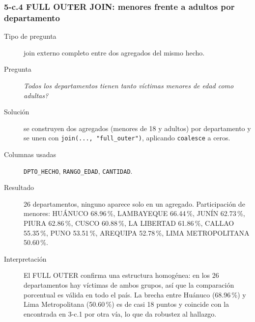 \subsubsection*{5-c.4 \textbar{} FULL OUTER JOIN: menores frente a adultos por departamento}
\begin{description}
\item[Tipo de pregunta] join externo completo entre dos agregados del mismo hecho.
\item[Pregunta] \emph{Todos los departamentos tienen tanto v\'ictimas menores de edad como
      adultas?}
\item[Soluci\'on] se construyen dos agregados (menores de 18 y adultos) por departamento y se
      unen con \texttt{join(..., "full\_outer")}, aplicando \texttt{coalesce} a ceros.
\item[Columnas usadas] \texttt{DPTO\_HECHO}, \texttt{RANGO\_EDAD}, \texttt{CANTIDAD}.
\item[Resultado] 26 departamentos, ninguno aparece solo en un agregado. Participaci\'on de
      menores: HU\'ANUCO 68.96\,\%, LAMBAYEQUE 66.44\,\%, JUN\'IN 62.73\,\%, PIURA 62.86\,\%,
      CUSCO 60.88\,\%, LA LIBERTAD 61.86\,\%, CALLAO 55.35\,\%, PUNO 53.51\,\%, AREQUIPA
      52.78\,\%, LIMA METROPOLITANA 50.60\,\%.
\item[Interpretaci\'on] El FULL OUTER confirma una estructura homog\'enea: en los 26
      departamentos hay v\'ictimas de ambos grupos, as\'i que la comparaci\'on porcentual es
      v\'alida en todo el pa\'is. La brecha entre Hu\'anuco (68.96\,\%) y Lima Metropolitana
      (50.60\,\%) es de casi 18 puntos y coincide con la encontrada en 3-c.1 por otra v\'ia, lo
      que da robustez al hallazgo.
\end{description}

